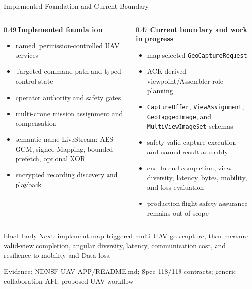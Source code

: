\documentclass[aspectratio=169]{beamer}
\newcommand{\bluebox}[1]{%
  \begin{beamercolorbox}[rounded=true,shadow=false,sep=0.65em,wd=0.94\linewidth]{block body}
  #1
  \end{beamercolorbox}
}
\newcommand{\evidence}[1]{%
  \vfill\par\noindent
  \begin{minipage}{\linewidth}
  \raggedright{\color{SoftGray}\tiny Evidence: #1}\par
  \end{minipage}
}
\begin{document}
\begin{frame}{Implemented Foundation and Current Boundary}
\scriptsize
\begin{columns}[T]
\begin{column}{0.49\textwidth}
\textbf{Implemented foundation}
\begin{itemize}
  \item named, permission-controlled UAV services
  \item Targeted command path and typed control state
  \item operator authority and safety gates
  \item multi-drone mission assignment and compensation
  \item semantic-name LiveStream: AES-GCM, signed Mapping, bounded prefetch, optional XOR
  \item encrypted recording discovery and playback
\end{itemize}
\end{column}
\begin{column}{0.47\textwidth}
\textbf{Current boundary and work in progress}
\begin{itemize}
  \item map-selected \texttt{GeoCaptureRequest}
  \item ACK-derived viewpoint/Assembler role planning
  \item \texttt{CaptureOffer}, \texttt{ViewAssignment}, \texttt{GeoTaggedImage}, and \texttt{MultiViewImageSet} schemas
  \item safety-valid capture execution and named result assembly
  \item end-to-end completion, view diversity, latency, bytes, mobility, and loss evaluation
  \item production flight-safety assurance remains out of scope
\end{itemize}
\end{column}
\end{columns}

\vspace{0.25em}
\bluebox{Next: implement map-triggered multi-UAV geo-capture, then measure valid-view completion, angular diversity, latency, communication cost, and resilience to mobility and Data loss.}
\evidence{NDNSF-UAV-APP/README.md; Spec 118/119 contracts; generic collaboration API; proposed UAV workflow}
\end{frame}
\end{document}
